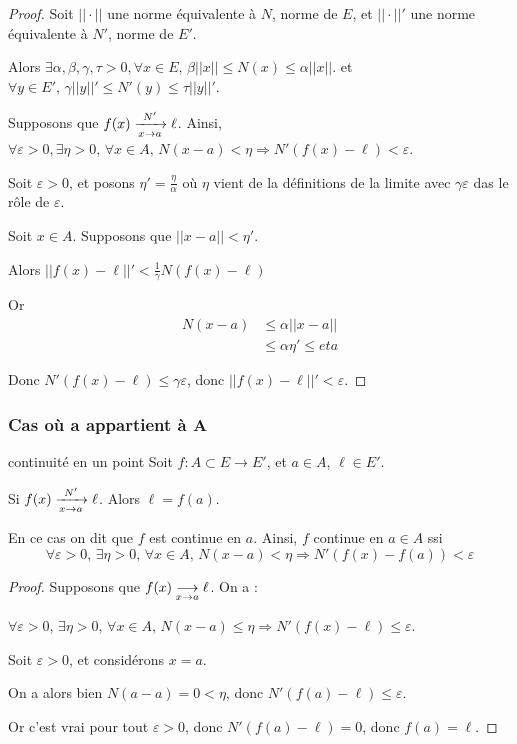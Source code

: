 \begin{proof}
    Soit $||\cdot||$ une norme équivalente à $N$, norme de $E$, 
    et $||\cdot||'$ une norme équivalente à $N'$, norme de $E'$.

    Alors $\exists \alpha, \beta, \gamma, \tau > 0, \forall x \in E, \, \beta ||x|| \leqslant N(x) \leqslant \alpha ||x||$.
    et $\forall y \in E', \, \gamma ||y||' \leqslant N'(y) \leqslant \tau ||y||'$.

    Supposons que $f(x) \limitnorme{N'} x a \ell$. Ainsi, $\forall \varepsilon > 0, \exists \eta > 0, \, \forall x \in A, \, N(x - a) < \eta \Rightarrow N'(f(x) - \ell) < \varepsilon$.

    Soit $\varepsilon > 0$, et posons $\eta' = \frac \eta \alpha$ où $\eta$ vient de la 
    définitions de la limite avec $\gamma \varepsilon$ das le rôle de $\varepsilon$.

    Soit $x \in A$. Supposons que $||x - a|| < \eta'$. 

    Alors $||f(x) - \ell||' < \frac 1 \gamma N(f(x) - \ell)$

    Or \begin{align*}
        N(x - a) & \leqslant \alpha ||x - a|| \\
        & \leqslant \alpha \eta ' \leqslant eta 
    \end{align*}

    Donc $N'(f(x) - \ell) \leqslant \gamma \varepsilon$, donc $||f(x) - \ell||' < \varepsilon$.
\end{proof}



\subsubsection{Cas où a appartient à A}

\begin{theoreme}{continuité en un point}{}
    Soit $f : A \subset E \to E'$, et $a \in A$, $\ell \in E'$. 

    Si $f(x) \limitnorme{N'}{x}{a} \ell$. Alors $\ell = f(a)$.

    En ce cas on dit que $f$ est continue en $a$. Ainsi, $f$ continue en $a \in A$ ssi 
    $$\forall \varepsilon > 0, \, \exists \eta > 0, \, \forall x \in A, \, N(x - a) < \eta \Rightarrow N'(f(x) - f(a)) < \varepsilon$$
\end{theoreme}


\begin{proof}
    Supposons que $f(x) \limit x a \ell$. On a : 

    $\forall \varepsilon > 0, \, \exists \eta > 0, \, \forall x \in A, \, N(x - a) \leqslant \eta \Rightarrow N'(f(x) - \ell) \leqslant \varepsilon$.

    Soit $\varepsilon > 0$, et considérons $x = a$.

    On a alors bien $N(a - a) = 0 < \eta$, donc $N'(f(a) - \ell) \leqslant \varepsilon$.

    Or c'est vrai pour tout $\varepsilon > 0$, donc $N'(f(a) - \ell) = 0$, donc $f(a) = \ell$.
\end{proof}


